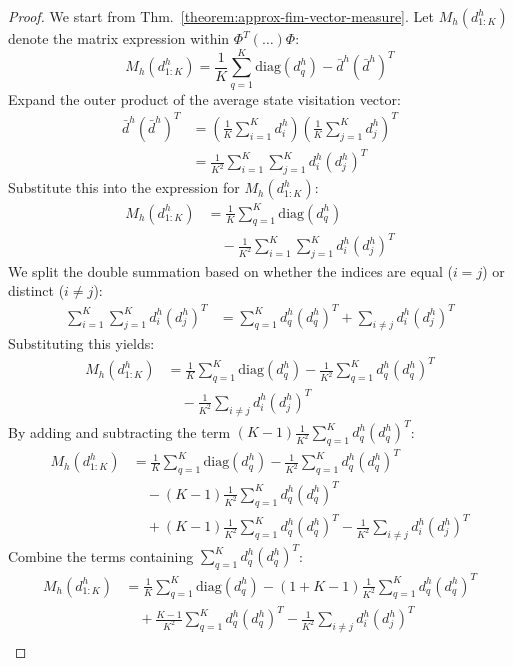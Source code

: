 \documentclass{article}
\begin{document}
\begin{proof}
We start from Thm.~\ref{theorem:approx-fim-vector-measure}. Let $M_h(d_{1:K}^h)$ denote the matrix expression within $\Phi^T(\dots)\Phi$:
\[ M_h(d_{1:K}^h) = \frac{1}{K} \sum_{q=1}^K \mathrm{diag}(d^h_q) - \bar{d}^h (\bar{d}^h)^T \]
Expand the outer product of the average state visitation vector:
\begin{align*}
\bar{d}^h (\bar{d}^h)^T
&= \left( \frac{1}{K} \sum_{i=1}^K d^h_i \right) \left( \frac{1}{K} \sum_{j=1}^K d^h_j \right)^T \\
&= \frac{1}{K^2} \sum_{i=1}^K \sum_{j=1}^K d^h_i (d^h_j)^T
\end{align*}
Substitute this into the expression for $M_h(d_{1:K}^h)$:
\begin{align*}
M_h(d_{1:K}^h)
&= \frac{1}{K} \sum_{q=1}^K \mathrm{diag}(d^h_q) \\
&\quad - \frac{1}{K^2} \sum_{i=1}^K \sum_{j=1}^K d^h_i (d^h_j)^T
\end{align*}
We split the double summation based on whether the indices are equal ($i=j$) or distinct ($i \neq j$):
\begin{align*}
\sum_{i=1}^K \sum_{j=1}^K d^h_i (d^h_j)^T &= \sum_{q=1}^K d^h_q (d^h_q)^T + \sum_{i \neq j} d^h_i (d^h_j)^T
\end{align*}
Substituting this yields:
\begin{align*}
M_h(d_{1:K}^h)
&= \frac{1}{K} \sum_{q=1}^K \mathrm{diag}(d^h_q)
 - \frac{1}{K^2} \sum_{q=1}^K d^h_q (d^h_q)^T \\
&\quad - \frac{1}{K^2} \sum_{i \neq j} d^h_i (d^h_j)^T
\end{align*}
By adding and subtracting the term $(K-1)\frac{1}{K^2} \sum_{q=1}^K d^h_q (d^h_q)^T$:
\begin{align*}
M_h(d_{1:K}^h)
&= \frac{1}{K} \sum_{q=1}^K \mathrm{diag}(d^h_q)
 - \frac{1}{K^2} \sum_{q=1}^K d^h_q (d^h_q)^T \\
&\quad - (K-1)\frac{1}{K^2} \sum_{q=1}^K d^h_q (d^h_q)^T \\
&\quad + (K-1)\frac{1}{K^2} \sum_{q=1}^K d^h_q (d^h_q)^T
 - \frac{1}{K^2} \sum_{i \neq j} d^h_i (d^h_j)^T
\end{align*}
Combine the terms containing $\sum_{q=1}^K d^h_q (d^h_q)^T$:
\begin{align*}
M_h(d_{1:K}^h)
&= \frac{1}{K} \sum_{q=1}^K \mathrm{diag}(d^h_q)
 - (1 + K - 1)\frac{1}{K^2} \sum_{q=1}^K d^h_q (d^h_q)^T \\
&\quad + \frac{K-1}{K^2} \sum_{q=1}^K d^h_q (d^h_q)^T
 - \frac{1}{K^2} \sum_{i \neq j} d^h_i (d^h_j)^T \\

\end{align*}
\end{proof}
\end{document}
